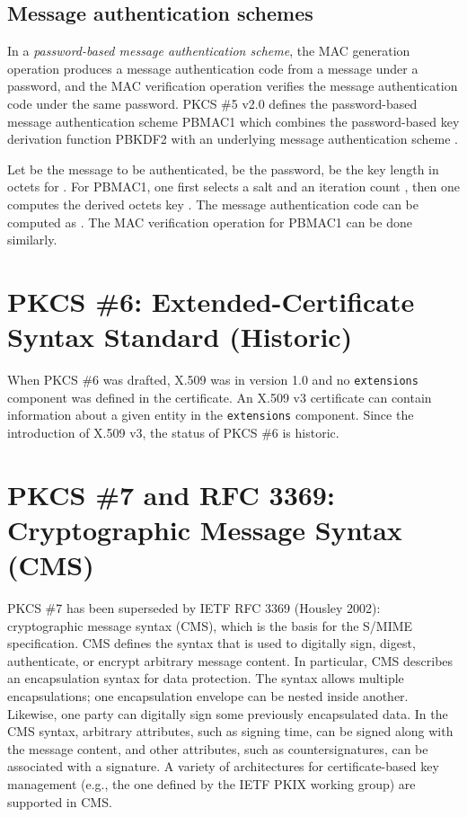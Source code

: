 \documentclass{article}
\begin{document}
\subsection{Message authentication schemes}
In a {\em password-based message authentication scheme}, the
MAC generation operation produces a message authentication code
from a message under a password, and the MAC verification
operation verifies the message authentication 
code under the same password. PKCS \#5 v2.0 defines the password-based 
message authentication scheme PBMAC1 which combines the password-based 
key derivation function PBKDF2 with an underlying message authentication 
scheme . 

Let  be the message to be authenticated,  be the password, 
 be the key length
in octets for . For PBMAC1, one first
selects a salt  and an iteration count , then one 
computes the derived  octets key .
The message authentication code  can be computed as
. 
The MAC verification operation for PBMAC1 can be done similarly.

\section{PKCS \#6: Extended-Certificate Syntax Standard (Historic)} 
\label{pkcs6}
When PKCS \#6 was drafted, X.509 was in version 1.0
and no {\tt extensions} component was defined in the certificate. 
An X.509 v3 certificate can contain information about 
a given entity in the {\tt extensions} component.
Since the introduction of X.509 v3, the status of PKCS \#6 is historic.

\section{PKCS \#7 and RFC 3369: Cryptographic Message Syntax (CMS)}
\label{pkcs7}
PKCS \#7 has been superseded by IETF RFC 3369 (Housley 2002): 
cryptographic message syntax (CMS), which is the basis for the 
S/MIME specification. CMS defines the syntax that is used to
digitally sign, digest, authenticate, or encrypt arbitrary message content.
In particular, CMS describes an encapsulation syntax for data protection. 
The syntax allows multiple encapsulations; one encapsulation envelope 
can be nested inside another. Likewise, one party can digitally sign some
previously encapsulated data. In the CMS syntax, arbitrary attributes,
such as signing time, can be signed along with the message content,
and other attributes, such as countersignatures, can be
associated with a signature. A variety of architectures for 
certificate-based key management (e.g., the one defined
by the IETF PKIX working group) are supported in CMS.
\end{document}
